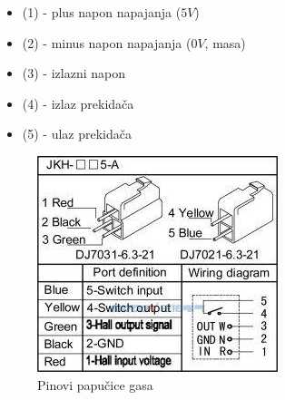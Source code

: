 \begin{itemize}
	\item (1) - plus napon napajanja ($5V$)
	\item (2) - minus napon napajanja ($0V$, masa)
	\item (3) - izlazni napon
	\item (4) - izlaz prekidača
	\item (5) - ulaz prekidača
\end{itemize}

\begin{figure}
\centering
\includegraphics[scale=1]{slike/foot_throttle.png}
\caption{Pinovi papučice gasa}
\label{fig:gas}
\end{figure}






